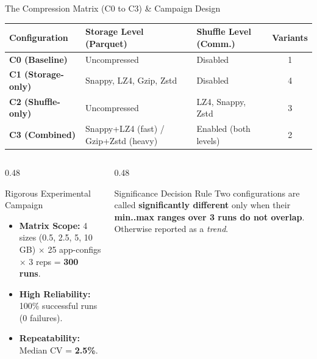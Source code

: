 \documentclass[aspectratio=169, 10pt]{beamer}
\begin{document}
\begin{frame}{The Compression Matrix (C0 to C3) \& Campaign Design}
  \begin{table}
    \centering
    \footnotesize
    \begin{tabular}{lllc}
      \toprule
      \textbf{Configuration} & \textbf{Storage Level (Parquet)} & \textbf{Shuffle Level (Comm.)} & \textbf{Variants} \\
      \midrule
      \textbf{C0 (Baseline)} & Uncompressed & Disabled & 1 \\
      \textbf{C1 (Storage-only)} & Snappy, LZ4, Gzip, Zstd & Disabled & 4 \\
      \textbf{C2 (Shuffle-only)} & Uncompressed & LZ4, Snappy, Zstd & 3 \\
      \textbf{C3 (Combined)} & Snappy+LZ4 (fast) / Gzip+Zstd (heavy) & Enabled (both levels) & 2 \\
      \bottomrule
    \end{tabular}
  \end{table}

  \vspace{0.15cm}

  \begin{columns}[T]
    \begin{column}{0.48\textwidth}
      \begin{block}{Rigorous Experimental Campaign}
        \begin{itemize}
          \footnotesize
          \item \textbf{Matrix Scope:} 4 sizes (0.5, 2.5, 5, 10 GB) $\times$ 25 app-configs $\times$ 3 reps = \textbf{300 runs}.
          \item \textbf{High Reliability:} 100\% successful runs (0 failures).
          \item \textbf{Repeatability:} Median CV = \textbf{2.5\%}.
        \end{itemize}
      \end{block}
    \end{column}

    \begin{column}{0.48\textwidth}
      \begin{alertblock}{Significance Decision Rule}
        \footnotesize
        Two configurations are called \textbf{significantly different} only when their \textbf{min..max ranges over 3 runs do not overlap}. Otherwise reported as a \textit{trend}.
      \end{alertblock}


\end{column}
\end{columns}
\end{frame}
\end{document}
